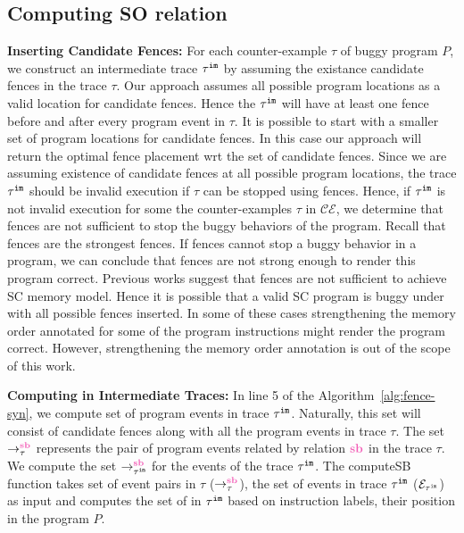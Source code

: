 

\subsection{Computing SO relation}
\noindent\textbf{Inserting Candidate Fences:}
For each counter-example $ \tau $ of buggy program $ P $, we 
construct an intermediate trace $ {\tau}^{\mathtt{im}} $ by assuming the existance candidate fences in the trace $ \tau $.
Our approach assumes all possible program locations as a valid location 
for candidate fences. 
Hence the $ {\tau}^{\mathtt{im}} $ will have at least one \mosc fence before and after every program event in $ \tau $.
It is possible to start with a smaller set of program locations for 
candidate fences. 
In this case our approach will return the optimal fence placement wrt the 
set of candidate fences.
Since we are assuming existence of candidate fences at all possible 
program locations, the trace $ {\tau}^{\mathtt{im}} $ should be invalid \cc execution 
if $ \tau $ can be stopped using \mosc fences.
Hence, if $ {\tau}^{\mathtt{im}} $ is not invalid \cc execution for some 
the counter-examples $ \tau $ in $ \mathcal{CE} $, we determine that \mosc 
fences are not sufficient to stop the buggy behaviors of the program.
Recall that \mosc fences are the strongest \cc fences. 
If \mosc fences cannot stop a buggy behavior in a program, we can conclude 
that \cc fences are not strong enough to render this program correct.
Previous works \cite{LahavVafeiadis-PLDI17,Batty-POPL12} suggest that \mosc fences are not sufficient to achieve SC memory 
model. 
Hence it is possible that a valid SC program is buggy under \cc with all 
possible \mosc fences inserted. 
In some of these cases strengthening the memory order annotated for some 
of the program instructions might render the program correct. 
However, strengthening the memory order annotation is out of the scope of this work. 

\noindent\textbf{Computing \lsb in Intermediate Traces:} 
In line 5 of the Algorithm~\ref{alg:fence-syn}, we compute set of program 
events in trace $ {\tau}^{\mathtt{im}} $. Naturally, this set will consist of 
candidate fences along with all the program events in trace $ \tau $.
The set $ \setSB $ represents the pair of program events related by 
relation $ \lsb $ in the trace $ \tau $. We compute the set 
$ \seqb{\im{\tau}}{}{} $ for the events of the trace $ {\tau}^{\mathtt{im}} $. 
The computeSB function takes set of \lsb event pairs in $ \tau $ 
($ \setSB $), the set of events in trace $ {\tau}^{\mathtt{im}} $ 
($ \mathcal{E}_{{\tau}^{\mathtt{im}}} $) as input and computes the set of \lsb in 
$ {\tau}^{\mathtt{im}} $ based on instruction labels, their position in the program $ P $. 

